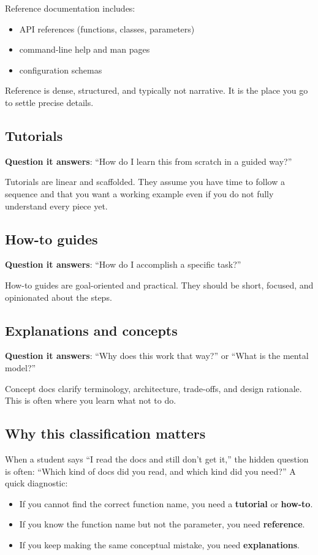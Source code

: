 Reference documentation includes:
\begin{itemize}[noitemsep]
  \item API references (functions, classes, parameters)
  \item command-line help and man pages
  \item configuration schemas
\end{itemize}

Reference is dense, structured, and typically not narrative. It is the place you go to settle precise details.

\subsection{Tutorials}
\textbf{Question it answers}: “How do I learn this from scratch in a guided way?”

Tutorials are linear and scaffolded. They assume you have time to follow a sequence and that you want a working example even if you do not fully understand every piece yet.

\subsection{How-to guides}
\textbf{Question it answers}: “How do I accomplish a specific task?”

How-to guides are goal-oriented and practical. They should be short, focused, and opinionated about the steps.

\subsection{Explanations and concepts}
\textbf{Question it answers}: “Why does this work that way?” or “What is the mental model?”

Concept docs clarify terminology, architecture, trade-offs, and design rationale. This is often where you learn what not to do.

\subsection{Why this classification matters}
When a student says “I read the docs and still don’t get it,” the hidden question is often: “Which kind of docs did you read, and which kind did you need?” A quick diagnostic:
\begin{itemize}[noitemsep]
  \item If you cannot find the correct function name, you need a \textbf{tutorial} or \textbf{how-to}.
  \item If you know the function name but not the parameter, you need \textbf{reference}.
  \item If you keep making the same conceptual mistake, you need \textbf{explanations}.
\end{itemize}

